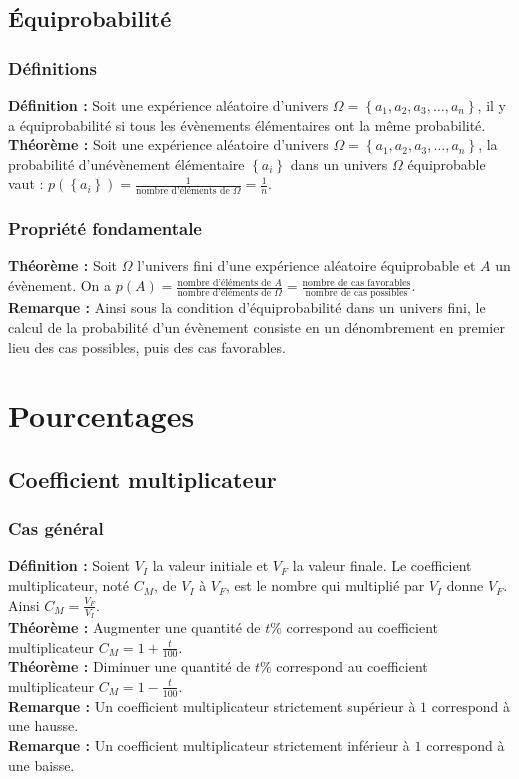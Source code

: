 \documentclass[a4paper,titlepage]{article}
\let\oldsection\section
\renewcommand\section{\clearpage\oldsection}
\begin{document}
    \subsection{Équiprobabilité}
        \subsubsection{Définitions}
            \textbf{Définition :} Soit une expérience aléatoire d’univers $\varOmega=\left\{a_{1},a_{2},a_{3},\ldots,a_{n}\right\}$, il y a équiprobabilité si tous les évènements élémentaires ont la même probabilité.
            \\
            \textbf{Théorème :} Soit une expérience aléatoire d’univers $\varOmega=\left\{a_{1},a_{2},a_{3},\ldots,a_{n}\right\}$, la probabilité d’un\linebreak évènement élémentaire $\left\{a_{i}\right\}$ dans un univers $\varOmega$ équiprobable vaut : $p\left(\left\{a_{i}\right\}\right)=\frac{1}{\text{nombre d'éléments de }\varOmega}=\frac{1}{n}$.
        \subsubsection{Propriété fondamentale}
            \textbf{Théorème :} Soit $\varOmega$ l’univers fini d’une expérience aléatoire équiprobable et $A$ un évènement. On a $p\left(A\right)=\frac{\text{nombre d'éléments de }A}{\text{nombre d'éléments de }\varOmega}=\frac{\text{nombre de cas favorables}}{\text{nombre de cas possibles}}$.
            \\
            \textbf{Remarque :} Ainsi sous la condition d’équiprobabilité dans un univers fini, le calcul de la probabilité d’un évènement consiste en un dénombrement en premier lieu des cas possibles, puis des cas favorables.
\section{Pourcentages}
    \subsection{Coefficient multiplicateur}
        \subsubsection{Cas général}
            \textbf{Définition :} Soient $V_{I}$ la valeur initiale et $V_{F}$ la valeur finale. Le coefficient multiplicateur, noté $C_{M}$, de $V_{I}$ à $V_{F}$, est le nombre qui multiplié par $V_{I}$ donne $V_{F}$. Ainsi $C_{M}=\frac{V_{F}}{V_{I}}$.
            \\
            \textbf{Théorème :} Augmenter une quantité de $t\%$ correspond au coefficient multiplicateur $C_{M}=1+\frac{t}{100}$.
            \\
            \textbf{Théorème :} Diminuer une quantité de $t\%$ correspond au coefficient multiplicateur $C_{M}=1-\frac{t}{100}$.
            \\
            \textbf{Remarque :} Un coefficient multiplicateur strictement supérieur à $1$ correspond à une hausse.
            \\
            \textbf{Remarque :} Un coefficient multiplicateur strictement inférieur à $1$ correspond à une baisse.
\end{document}
